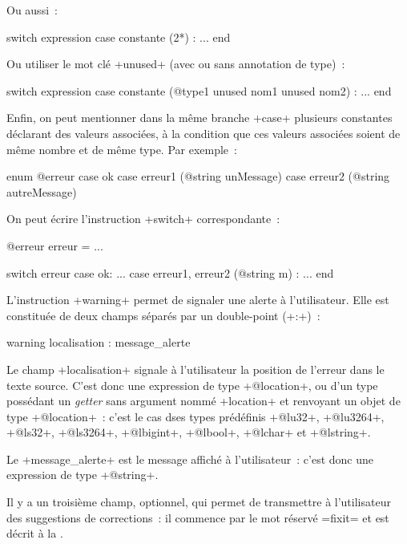 Ou aussi~:
\begin{galgas4}
switch expression
case constante (2*) :
...
end
\end{galgas4}


Ou utiliser le mot clé \ggsq+unused+ (avec ou sans annotation de type)~:
\begin{galgas4}
switch expression
case constante (@type1 unused nom1 unused nom2) :
...
end
\end{galgas4}


Enfin, on peut mentionner dans la même branche \ggsq+case+ plusieurs constantes déclarant des valeurs associées, à la condition que ces valeurs associées soient de même nombre et de même type. Par exemple~:

\begin{galgas4}
enum @erreur {
  case ok
  case erreur1 (@string unMessage)
  case erreur2 (@string autreMessage)
}
\end{galgas4}

On peut écrire l'instruction \ggsq+switch+ correspondante~:
\begin{galgas4}
@erreur erreur = ...

switch erreur
case ok:
  ...
case erreur1, erreur2 (@string m) :
  ...
end
\end{galgas4}





L'instruction \ggsq+warning+ permet de signaler une alerte à l'utilisateur. Elle est constituée de deux champs séparés par un double-point (\ggsq+:+)~:

\begin{galgas4}
warning localisation : message_alerte
\end{galgas4}



Le champ \ggsq+localisation+ signale à l'utilisateur la position de l'erreur dans le texte source. C'est donc une expression de type \ggsq+@location+, ou d'un type possédant un \emph{getter} sans argument nommé \ggsq+location+ et renvoyant un objet de type \ggsq+@location+~: c'est le cas dses types prédéfinis \ggsq+@lu32+, \ggsq+@lu3264+, \ggsq+@ls32+, \ggsq+@ls3264+, \ggsq+@lbigint+, \ggsq+@lbool+, \ggsq+@lchar+ et \ggsq+@lstring+.


Le \ggsq+message_alerte+ est le message affiché à l'utilisateur~: c'est donc une expression de type \ggsq+@string+.

Il y a un troisième champ, optionnel, qui permet de transmettre à l'utilisateur des suggestions de corrections~: il commence par le mot réservé \ggsq=fixit= et est décrit à la .

